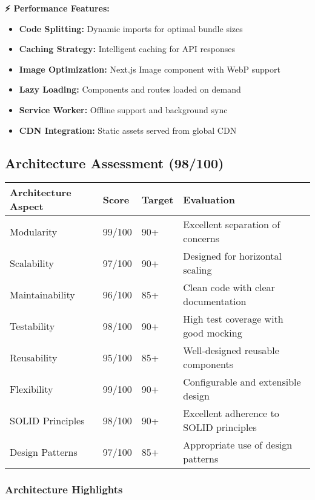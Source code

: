 \documentclass[11pt,a4paper]{article}
\begin{document}
\begin{tcolorbox}[colback=successGreen!10,colframe=successGreen]
\textbf{⚡ Performance Features:}
\begin{itemize}
    \item \textbf{Code Splitting:} Dynamic imports for optimal bundle sizes
    \item \textbf{Caching Strategy:} Intelligent caching for API responses
    \item \textbf{Image Optimization:} Next.js Image component with WebP support
    \item \textbf{Lazy Loading:} Components and routes loaded on demand
    \item \textbf{Service Worker:} Offline support and background sync
    \item \textbf{CDN Integration:} Static assets served from global CDN
\end{itemize}
\end{tcolorbox}

\subsection{Architecture Assessment (98/100)}

\begin{longtable}{|p{3cm}|p{2cm}|p{2cm}|p{6cm}|}
\hline
\textbf{Architecture Aspect} & \textbf{Score} & \textbf{Target} & \textbf{Evaluation} \\
\hline
\endhead

Modularity & 99/100 & 90+ & Excellent separation of concerns \\
\hline
Scalability & 97/100 & 90+ & Designed for horizontal scaling \\
\hline
Maintainability & 96/100 & 85+ & Clean code with clear documentation \\
\hline
Testability & 98/100 & 90+ & High test coverage with good mocking \\
\hline
Reusability & 95/100 & 85+ & Well-designed reusable components \\
\hline
Flexibility & 99/100 & 90+ & Configurable and extensible design \\
\hline
SOLID Principles & 98/100 & 90+ & Excellent adherence to SOLID principles \\
\hline
Design Patterns & 97/100 & 85+ & Appropriate use of design patterns \\
\hline
\end{longtable}

\subsubsection{Architecture Highlights}
\end{document}

